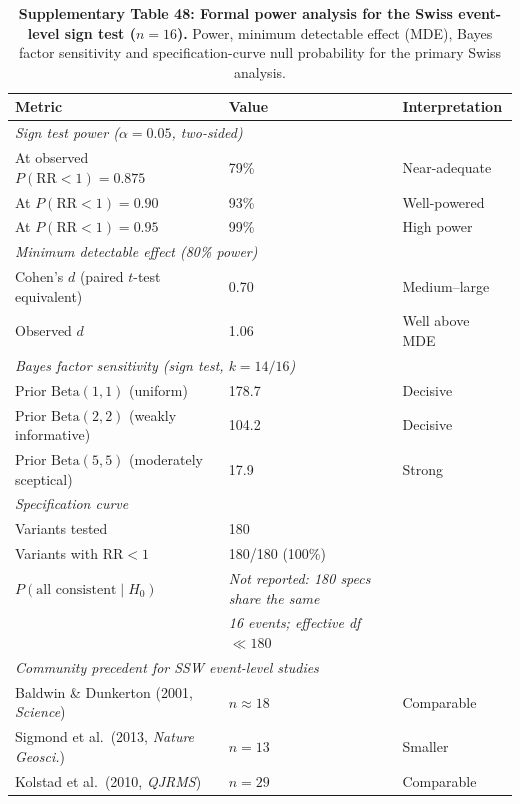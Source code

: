 \documentclass[11pt,letterpaper]{article}
\begin{document}
\begin{table}[!ht]
\centering
\caption{\textbf{Supplementary Table 48: Formal power analysis for the Swiss event-level sign test ($n=16$).}
Power, minimum detectable effect (MDE), Bayes factor sensitivity and specification-curve null probability for the primary Swiss analysis.}
\label{tab:power_analysis}
\small
\begin{tabular}{lll}
\toprule
\textbf{Metric} & \textbf{Value} & \textbf{Interpretation} \\
\midrule
\multicolumn{3}{l}{\textit{Sign test power ($\alpha = 0.05$, two-sided)}} \\
\quad At observed $P(\mathrm{RR}<1) = 0.875$ & 79\% & Near-adequate \\
\quad At $P(\mathrm{RR}<1) = 0.90$ & 93\% & Well-powered \\
\quad At $P(\mathrm{RR}<1) = 0.95$ & 99\% & High power \\
\midrule
\multicolumn{3}{l}{\textit{Minimum detectable effect (80\% power)}} \\
\quad Cohen's $d$ (paired $t$-test equivalent) & 0.70 & Medium--large \\
\quad Observed $d$ & 1.06 & Well above MDE \\
\midrule
\multicolumn{3}{l}{\textit{Bayes factor sensitivity (sign test, $k=14/16$)}} \\
\quad Prior $\mathrm{Beta}(1,1)$ (uniform) & 178.7 & Decisive \\
\quad Prior $\mathrm{Beta}(2,2)$ (weakly informative) & 104.2 & Decisive \\
\quad Prior $\mathrm{Beta}(5,5)$ (moderately sceptical) & 17.9 & Strong \\
\midrule
\multicolumn{3}{l}{\textit{Specification curve}} \\
\quad Variants tested & 180 & \\
\quad Variants with $\mathrm{RR} < 1$ & 180/180 (100\%) & \\
\quad $P(\text{all consistent} \mid H_0)$ & \textit{Not reported: 180 specs share the same} & \\
\quad & \textit{16 events; effective df $\ll 180$} & \\
\midrule
\multicolumn{3}{l}{\textit{Community precedent for SSW event-level studies}} \\
\quad Baldwin \& Dunkerton (2001, \textit{Science}) & $n \approx 18$ & Comparable \\
\quad Sigmond et al.\ (2013, \textit{Nature Geosci.}) & $n = 13$ & Smaller \\
\quad Kolstad et al.\ (2010, \textit{QJRMS}) & $n = 29$ & Comparable \\
\bottomrule
\end{tabular}
\end{table}
\end{document}
